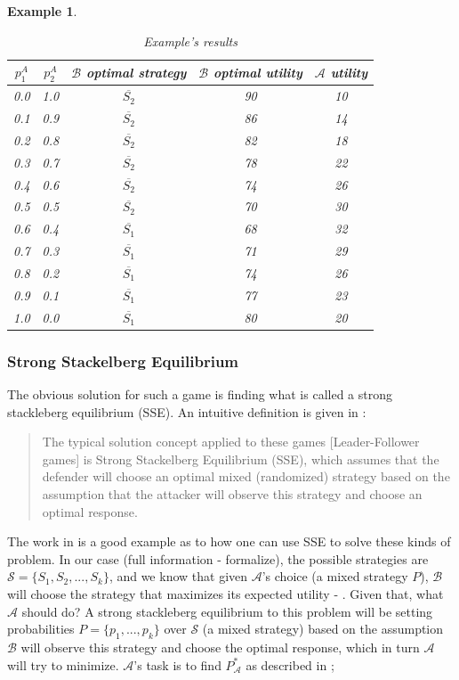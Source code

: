 \documentclass[a4paper,10pt]{article}
\newtheorem{Example}{Example}[section]
\newcommand{\A}{\ensuremath{\mathcal{A}}\xspace}
\newcommand{\B}{\ensuremath{\mathcal{B}}\xspace}
\begin{document}
\begin{Example}
\begin{table}[]
\begin{tabular}{|c|c|c|c|c|}
{$p_1^A$} & {$p_2^A$} & {\B optimal strategy} & {\B optimal utility} & {\A utility}\\\hline
0.0 & 1.0 & $\overline{S_2}$ & 90 & 10\\
0.1 & 0.9 & $\overline{S_2}$ & 86 & 14\\
0.2 & 0.8 & $\overline{S_2}$ & 82 & 18\\
0.3 & 0.7 & $\overline{S_2}$ & 78 & 22\\
0.4 & 0.6 & $\overline{S_2}$ & 74 & 26\\
0.5 & 0.5 & $\overline{S_2}$ & 70 & 30\\
0.6 & 0.4 & $\overline{S_1}$ & 68 & 32\\
0.7 & 0.3 & $\overline{S_1}$ & 71 & 29\\
0.8 & 0.2 & $\overline{S_1}$ & 74 & 26\\
0.9 & 0.1 & $\overline{S_1}$ & 77 & 23\\
1.0 & 0.0 & $\overline{S_1}$ & 80 & 20\\
\hline
    \end{tabular}
    \caption{Example's results}
    \label{tables: example result}
\end{table}
\end{Example}

\subsubsection{Strong Stackelberg Equilibrium}
The obvious solution for such a game is finding what is called a strong stackleberg equilibrium (SSE). An intuitive definition is given in \cite{korzhyk2011stackelberg}:
\begin{quote}
    The typical solution concept applied to these games [Leader-Follower games] is Strong  Stackelberg Equilibrium (SSE), which assumes that the defender will choose an optimal mixed (randomized) strategy based on the assumption that the attacker will observe this strategy and choose an optimal response.
\end{quote}

The work in  \cite{korzhyk2011stackelberg} is a good example as to how one can use SSE to solve these kinds of problem. In our case (full information - formalize), the possible strategies are $\mathcal{S}=\{S_1,S_2,...,S_k\}$, and we know that given \A's choice (a mixed strategy $P$), \B will choose the strategy that maximizes its expected utility - \crbs. Given that, what \A should do?
A strong stackleberg equilibrium to this problem will be setting probabilities $P=\{p_1,...,p_k\}$ over $\mathcal{S}$ (a mixed strategy) based on the assumption \B will observe this strategy and choose the optimal response, which in turn \A will try to minimize. \A's task is to find $P_{\A}^*$ as described in ; 
\end{document}
